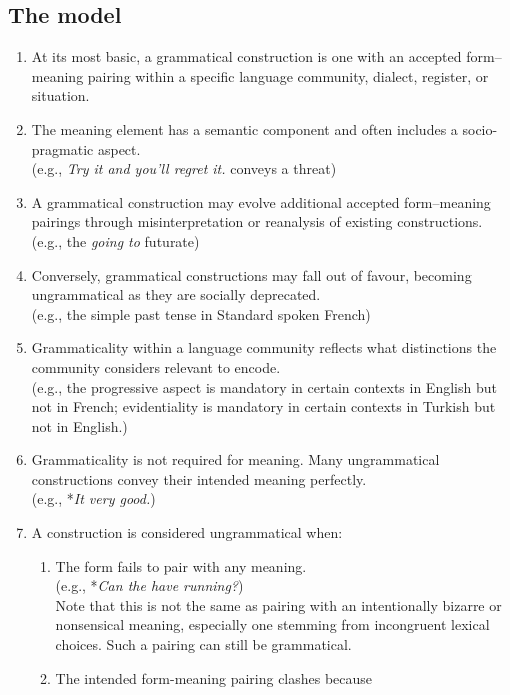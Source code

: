 \subsection{The model}

\begin{enumerate}
    \item At its most basic, a grammatical construction is one with an accepted form–meaning pairing within a specific language community, dialect, register, or situation.
    \item The meaning element has a semantic component and often includes a socio-pragmatic aspect. \\(e.g., \textit{Try it and you'll regret it.} conveys a threat)
    \item A grammatical construction may evolve additional accepted form–meaning pairings through misinterpretation or reanalysis of existing constructions. \\(e.g., the \textit{going to} futurate)
    \item Conversely, grammatical constructions may fall out of favour, becoming ungrammatical as they are socially deprecated. \\(e.g., the simple past tense in Standard spoken French)
    \item Grammaticality within a language community reflects what distinctions the community considers relevant to encode.\\(e.g., the progressive aspect is mandatory in certain contexts in English but not in French; evidentiality is mandatory in certain contexts in Turkish but not in English.)
    \item Grammaticality is not required for meaning. Many ungrammatical constructions convey their intended meaning perfectly. \\(e.g., *\textit{It very good.})
    \item A construction is considered ungrammatical when:
    \begin{enumerate}
        \item The form fails to pair with any meaning. \\(e.g., *\textit{Can the have running?})\\ Note that this is not the same as pairing with an intentionally bizarre or nonsensical meaning, especially one stemming from incongruent lexical choices. Such a pairing can still be grammatical.
        \item The intended form-meaning pairing clashes because
        \begin{enumerate}

\end{enumerate}
\end{enumerate}
\end{enumerate}
